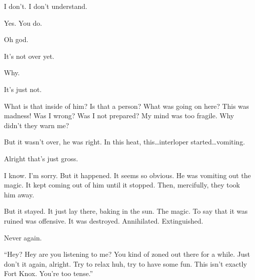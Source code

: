 I don’t. I don’t understand.

Yes. You do.

Oh god.

It’s not over yet.

Why.

It’s just not.

What is that inside of him? Is that a person? What was going on here? This was madness! Was I wrong? Was I not prepared? My mind was too fragile. Why didn’t they warn me?

But it wasn’t over, he was right. In this heat, this\ldots  interloper started\ldots  vomiting.

Alright that’s just gross.

I know. I’m sorry. But it happened. It seems so obvious. He was vomiting out the magic. It kept coming out of him until it stopped. Then, mercifully, they took him away.

But it stayed. It just lay there, baking in the sun. The magic. To say that it was ruined was offensive. It was destroyed. Annihilated. Extinguished.

Never again.

\secdiv

``Hey? Hey are you listening to me? You kind of zoned out there for a while. Just don’t it again, alright. Try to relax huh, try to have some fun. This isn’t exactly Fort Knox. You’re too tense.''
